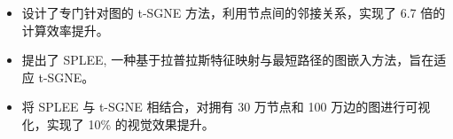 

\begin{itemize}[nosep]
  \item 设计了专门针对图的 t-SGNE 方法，利用节点间的邻接关系，实现了 6.7 倍的计算效率提升。
  \item 提出了 SPLEE, 一种基于拉普拉斯特征映射与最短路径的图嵌入方法，旨在适应 t-SGNE。
  \item 将 SPLEE 与 t-SGNE 相结合，对拥有 30 万节点和 100 万边的图进行可视化，实现了 10\% 的视觉效果提升。
\end{itemize}
